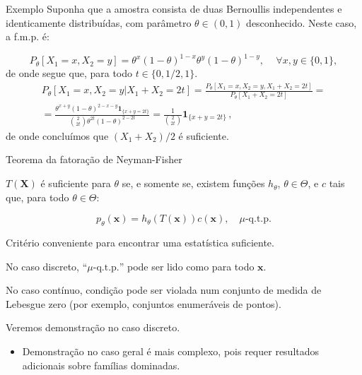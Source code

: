 \documentclass[11pt]{beamer}
\newenvironment{halfwideitemize}{\itemize\addtolength{\itemsep}{0.5em}}{\enditemize}
\begin{document}
	\begin{frame}{Exemplo}
		Suponha que a amostra consista de duas Bernoullis independentes e identicamente distribuídas, com parâmetro $\theta \in (0,1)$ desconhecido. Neste caso, a f.m.p. é:
		
		$$P_\theta[X_1 = x, X_2 = y] = \theta^x (1-\theta)^{1-x} \theta^y (1-\theta)^{1-y},\, \quad \forall x,y \in \{0,1\},$$
		de onde segue que, para todo $t \in \{0,1/2,1\}$.
		\begin{equation*}
			\begin{aligned}         
				P_\theta[X_1 = x, X_2 = y| X_1 +  X_2 =  2 t] = \frac{P_\theta[X_1 = x, X_2 = y, X_1 +  X_2 =  2 t]}{P_\theta[X_1 +  X_2 =  2 t]} = \\
				= \frac{\theta^{x+y} (1-\theta)^{2-x-y}\mathbf{1}_{\{x+y = 2t\}}}{\binom{2}{2t} \theta^{2t}(1-\theta)^{2-2t}}= \frac{1}{\binom{2}{2t} } \mathbf{1}_{\{x+y = 2t\}} \, ,
			\end{aligned}
		\end{equation*}
		de onde concluímos que $(X_1+X_2)/2$ é suficiente.
	\end{frame}
	\begin{frame}{Teorema da fatoração de Neyman-Fisher}
		\begin{theorem}
			$T(\boldsymbol{X})$ é suficiente para $\theta$ se, e somente se, existem funções $h_\theta$, $\theta \in \Theta$, e $c$ tais que, para todo $\theta \in \Theta$:
			
			$$p_\theta(\boldsymbol{x}) = h_\theta(T(\boldsymbol{x}) )c(\boldsymbol{x}), \quad \mu\text{-q.t.p.}$$
		\end{theorem}
		
		\begin{halfwideitemize}
			\item Critério conveniente para encontrar uma estatística suficiente.
			\begin{halfwideitemize}
				\item No caso discreto, ``$\mu\text{-q.t.p.}$'' pode ser lido como para todo $\boldsymbol{x}$.
				\item No caso contínuo, condição pode ser violada num conjunto de medida de Lebesgue zero (por exemplo, conjuntos enumeráveis de pontos).
			\end{halfwideitemize}
			\item Veremos demonstração no caso discreto.
			\begin{itemize}
				\item Demonstração no caso geral é mais complexo, pois requer resultados adicionais sobre famílias dominadas.
			\end{itemize}
		\end{halfwideitemize}
		
	\end{frame}
	
\end{document}
